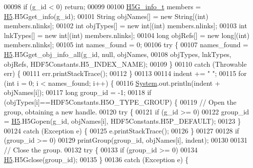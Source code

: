 \begin{DoxyCode}
00098         \textcolor{keywordflow}{if} (g\_id < 0) \textcolor{keywordflow}{return};
00099 
00100         \hyperlink{struct_h5_g__info__t}{H5G\_info\_t} members = \hyperlink{namespace_h5}{H5}.H5Gget\_info(g\_id);
00101         String objNames[] = \textcolor{keyword}{new} String[(int) members.nlinks];
00102         \textcolor{keywordtype}{int} objTypes[] = \textcolor{keyword}{new} \textcolor{keywordtype}{int}[(\textcolor{keywordtype}{int}) members.nlinks];
00103         \textcolor{keywordtype}{int} lnkTypes[] = \textcolor{keyword}{new} \textcolor{keywordtype}{int}[(int) members.nlinks];
00104         \textcolor{keywordtype}{long} objRefs[] = \textcolor{keyword}{new} \textcolor{keywordtype}{long}[(\textcolor{keywordtype}{int}) members.nlinks];
00105         \textcolor{keywordtype}{int} names\_found = 0;
00106         \textcolor{keywordflow}{try} \{
00107             names\_found = \hyperlink{namespace_h5}{H5}.H5Gget\_obj\_info\_all(g\_id, null, objNames,
00108                     objTypes, lnkTypes, objRefs, HDF5Constants.H5\_INDEX\_NAME);
00109         \}
00110         \textcolor{keywordflow}{catch} (Throwable err) \{
00111             err.printStackTrace();
00112         \}
00113 
00114         indent += \textcolor{stringliteral}{"    "};
00115         \textcolor{keywordflow}{for} (\textcolor{keywordtype}{int} i = 0; i < names\_found; i++) \{
00116             \hyperlink{namespace_system}{System}.out.println(indent + objNames[i]);
00117             \textcolor{keywordtype}{long} group\_id = -1;
00118             \textcolor{keywordflow}{if} (objTypes[i]==HDF5Constants.H5O\_TYPE\_GROUP) \{
00119                 \textcolor{comment}{// Open the group, obtaining a new handle.}
00120                 \textcolor{keywordflow}{try} \{
00121                     \textcolor{keywordflow}{if} (g\_id >= 0)
00122                         group\_id = \hyperlink{namespace_h5}{H5}.H5Gopen(g\_id, objNames[i], HDF5Constants.H5P\_DEFAULT);
00123                 \}
00124                 \textcolor{keywordflow}{catch} (Exception e) \{
00125                     e.printStackTrace();
00126                 \}
00127 
00128                 \textcolor{keywordflow}{if} (group\_id >= 0)
00129                     printGroup(group\_id, objNames[i], indent);
00130 
00131                 \textcolor{comment}{// Close the group.}
00132                 \textcolor{keywordflow}{try} \{
00133                     \textcolor{keywordflow}{if} (group\_id >= 0)
00134                         \hyperlink{namespace_h5}{H5}.H5Gclose(group\_id);
00135                 \}
00136                 \textcolor{keywordflow}{catch} (Exception e) \{

\end{DoxyCode}
